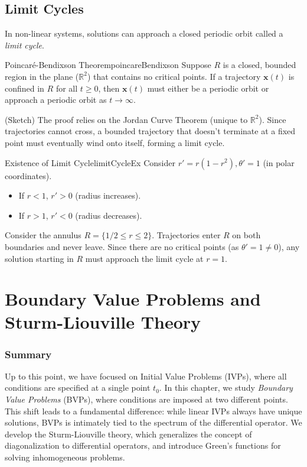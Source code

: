 \documentclass{book}
\newenvironment{Proof}[1][]
  {\begin{ProofTcb}[#1]}
  {\end{ProofTcb}}
\newcommand{\R}{{\mathbb{R}}}
\begin{document}
\section{Limit Cycles}

In non-linear systems, solutions can approach a closed periodic orbit called a \emph{limit cycle}.

\begin{thm}{Poincaré-Bendixson Theorem}{poincareBendixson}
    Suppose $R$ is a closed, bounded region in the plane ($\R^2$) that contains no critical points. If a trajectory $\mathbf{x}(t)$ is confined in $R$ for all $t \ge 0$, then $\mathbf{x}(t)$ must either be a periodic orbit or approach a periodic orbit as $t \to \infty$.
\end{thm}

\begin{Proof}
    (Sketch) The proof relies on the Jordan Curve Theorem (unique to $\R^2$). Since trajectories cannot cross, a bounded trajectory that doesn't terminate at a fixed point must eventually wind onto itself, forming a limit cycle.
\end{Proof}

\begin{example}{Existence of Limit Cycle}{limitCycleEx}
    Consider $r' = r(1-r^2), \theta' = 1$ (in polar coordinates).
    \begin{itemize}
        \item If $r < 1$, $r' > 0$ (radius increases).
        \item If $r > 1$, $r' < 0$ (radius decreases).
    \end{itemize}
    Consider the annulus $R = \{1/2 \le r \le 2\}$. Trajectories enter $R$ on both boundaries and never leave. Since there are no critical points (as $\theta' = 1 \ne 0$), any solution starting in $R$ must approach the limit cycle at $r=1$.
\end{example}

\chapter{Boundary Value Problems and Sturm-Liouville Theory}\label{cha:sturmLiouville}

\subsection*{Summary}
Up to this point, we have focused on Initial Value Problems (IVPs), where all conditions are specified at a single point $t_0$. In this chapter, we study \emph{Boundary Value Problems} (BVPs), where conditions are imposed at two different points. This shift leads to a fundamental difference: while linear IVPs always have unique solutions, BVPs is intimately tied to the spectrum of the differential operator. We develop the Sturm-Liouville theory, which generalizes the concept of diagonalization to differential operators, and introduce Green's functions for solving inhomogeneous problems.
\end{document}
